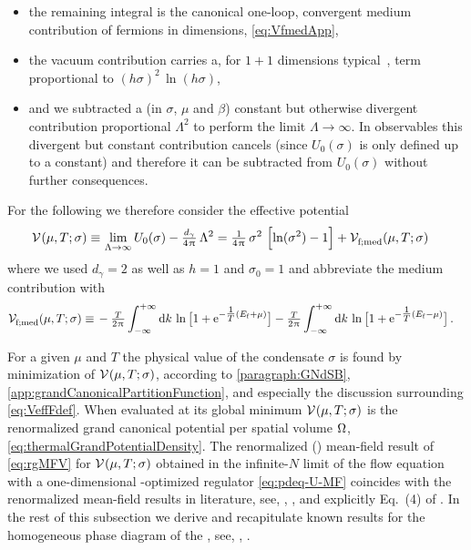 \begin{itemize}
	\item the remaining integral is the canonical one-loop, convergent medium contribution of fermions in  dimensions, \cf{} \cref{eq:VfmedApp},
	\item the vacuum contribution carries a, for $1 + 1$ dimensions typical~\cite{Actor:1985vh,Actor:1985xp,Actor:1986zf}, term proportional to $( h \sigma )^2 \, \ln ( h \sigma )$,
	\item and we subtracted a (in $\sigma$, $\mu$ and $\beta$) constant but otherwise divergent contribution proportional $\Lambda^2$ to perform the limit $\Lambda \rightarrow \infty$.
	In observables this divergent but constant contribution cancels (since $U_0(\sigma)$ is only defined up to a constant) and therefore it can be subtracted from $U_0(\sigma)$ without further consequences.
\end{itemize}
For the following we therefore consider the effective potential
	\begin{align}
		\VeffArgs{\muT;\sigma}\equiv \, & \lim_{\Lambda \rightarrow \infty} U_0(\sigma) - \tfrac{d_\gamma }{4\piu} \, \Lambda^2  =
	 \tfrac{1}{4 \piu} \, \sigma^2 \, \left[ \ln( \sigma^2 ) - 1 \right] + \VeffArgs[\mathrm{f};\med]{\muT;\sigma} \label{eq:rgMFV}
	\end{align}
where we used $d_\gamma=2$ as well as \wlogA{} $h = 1$ and $\sigma_0 = 1$ and abbreviate the medium contribution with 
\begin{align}
	\VeffArgs[\mathrm{f};\med]{\muT;\sigma} \equiv \, & - \tfrac{T}{2 \piu} \int_{-\infty}^{+\infty} \dif k \, \ln \big[ 1 + \eu^{- \tfrac{1}{T} ( E_\mathrm{f} + \mu )} \big] - \tfrac{T}{2 \piu} \int_{-\infty}^{+\infty} \dif k \, \ln \big[ 1 + \eu^{- \tfrac{1}{T} ( E_\mathrm{f} - \mu )} \big] \, .
\end{align}

For a given $\mu$ and $T$ the physical value of the condensate $\sigma$ is found by minimization of $\VeffArgs{\muT;\sigma}$, according to \cref{paragraph:GNdSB}, \cref{app:grandCanonicalPartitionFunction}, and especially the discussion surrounding \cref{eq:VeffFdef}.
When evaluated at its global minimum $\VeffArgs{\muT;\sigma}$ is the renormalized grand canonical potential per spatial volume $\Omega$, \cf{} \cref{eq:thermalGrandPotentialDensity}.
The renormalized (\frg{}) mean-field result of \cref{eq:rgMFV} for $\VeffArgs{\muT;\sigma}$ obtained in the infinite-$N$ limit of the \lpa{} flow equation with a one-dimensional \lpa{}-optimized regulator \eqref{eq:pdeq-U-MF} coincides with the renormalized mean-field results in literature, see, \eg{}, , and explicitly Eq.~(4) of .
In the rest of this subsection we derive and recapitulate known \mf{} results for the homogeneous phase diagram of the \gnm{}, see, \eg{}, .\bigskip

